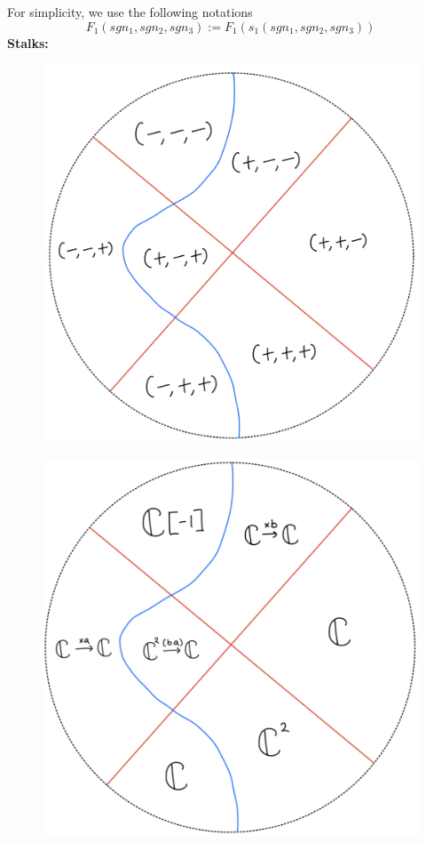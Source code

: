For simplicity, we use the following notations
\[
F_1(sgn_1,sgn_2,sgn_3):= F_1(s_1(sgn_1,sgn_2,sgn_3))
\]
\textbf{Stalks:}
\begin{figure}[H]
    \centering
    \includegraphics[scale = 0.45]{diagrams/lemma4/31.png}
    \caption{}
    \label{fig:your-label}
\end{figure}
\begin{figure}[H]
    \centering
    \includegraphics[scale = 0.45]{diagrams/lemma4/32.png}
    \caption{}
    \label{fig:your-label}
\end{figure}
